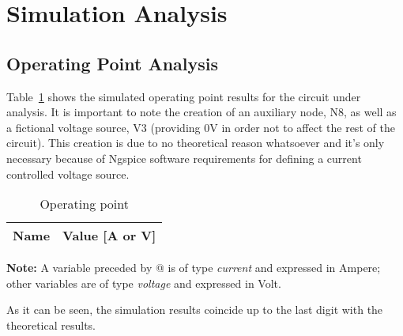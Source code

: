 \section{Simulation Analysis}
\label{sec:simulation}

\subsection{Operating Point Analysis}

Table~\ref{tab:op} shows the simulated operating point results for the circuit
under analysis. It is important to note the creation of an auxiliary node, N8, as well 
as a fictional voltage source, V3 (providing 0V in order not to affect the rest of the circuit). 
This creation is due to no theoretical reason whatsoever and it's only necessary because of Ngspice 
software requirements for defining a current controlled voltage source. 

\begin{table}[h]
  \centering
  \begin{tabular}{|l|r|}
    \hline    
 {\bf Name} & {\bf Value [A or V]} \\ \hline
 
  \end{tabular}
  \caption{Operating point}
  \label{tab:op}
\end{table}

\textbf{Note:}
A variable preceded by @ is of type {\em current}
    and expressed in Ampere; other variables are of type {\it voltage} and expressed in Volt.
    \vspace{0.3cm}
    \par
 As it can be seen, the simulation results coincide up to the last digit with the theoretical results.
 \vspace{6cm}
 \pagebreak




